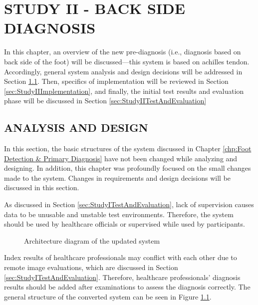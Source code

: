 \chapter{STUDY II - BACK SIDE DIAGNOSIS}\label{chp:Back Side Diagnosis}

In this chapter, an overview of the new pre-diagnosis (i.e., diagnosis based on back side of the foot) will be discussed—this system is based on achilles tendon. Accordingly, general system analysis and design decisions will be addressed in Section \ref{sec:StudyIIAnalysisAndDesign}. Then, specifics of implementation will be reviewed in Section \ref{sec:StudyIIImplementation}, and finally, the initial test results and evaluation phase will be discussed in Section \ref{sec:StudyIITestAndEvaluation}

\section{ANALYSIS AND DESIGN} \label{sec:StudyIIAnalysisAndDesign}

In this section, the basic structures of the system discussed in Chapter \ref{chp:Foot Detection & Primary Diagnosis} have not been changed while analyzing and designing. In addition, this chapter was profoundly focused on the small changes made to the system. Changes in requirements and design decisions will be discussed in this section.

As discussed in Section \ref{sec:StudyITestAndEvaluation}, lack of supervision causes data to be unusable and unstable test environments. Therefore, the system should be used by healthcare officials or supervised while used by participants.

\begin{figure}[htbp]
\centering
{}
\caption{Architecture diagram of the updated system}
\label{fig:GeneralArchitectureDiagramPartI}
\end{figure}

Index results of healthcare professionals may conflict with each other due to remote image evaluations, which are discussed in Section \ref{sec:StudyITestAndEvaluation}. Therefore, healthcare professionals’ diagnosis results should be added after examinations to assess the diagnosis correctly. The general structure of the converted system can be seen in Figure \ref{fig:GeneralArchitectureDiagramPartI}.

